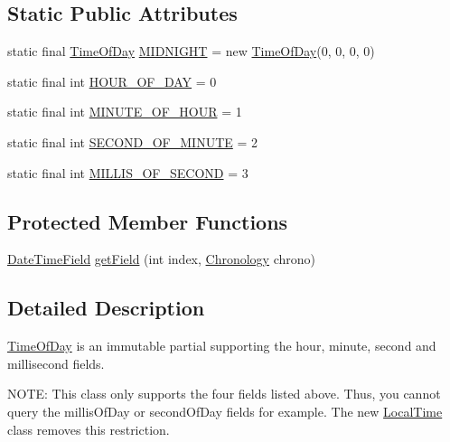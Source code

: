 \subsection*{Static Public Attributes}
\begin{DoxyCompactItemize}
\item 
static final \hyperlink{classorg_1_1joda_1_1time_1_1_time_of_day}{Time\-Of\-Day} \hyperlink{classorg_1_1joda_1_1time_1_1_time_of_day_afe663b1a8c33a8a853c7e8272ead9c70}{M\-I\-D\-N\-I\-G\-H\-T} = new \hyperlink{classorg_1_1joda_1_1time_1_1_time_of_day}{Time\-Of\-Day}(0, 0, 0, 0)
\item 
static final int \hyperlink{classorg_1_1joda_1_1time_1_1_time_of_day_a15d43f40b7279e700452c0a8ebf4f4c4}{H\-O\-U\-R\-\_\-\-O\-F\-\_\-\-D\-A\-Y} = 0
\item 
static final int \hyperlink{classorg_1_1joda_1_1time_1_1_time_of_day_a677626f485fafd75086254786d3b1397}{M\-I\-N\-U\-T\-E\-\_\-\-O\-F\-\_\-\-H\-O\-U\-R} = 1
\item 
static final int \hyperlink{classorg_1_1joda_1_1time_1_1_time_of_day_ab1cc4115688246202564f8ff3297a670}{S\-E\-C\-O\-N\-D\-\_\-\-O\-F\-\_\-\-M\-I\-N\-U\-T\-E} = 2
\item 
static final int \hyperlink{classorg_1_1joda_1_1time_1_1_time_of_day_a99d2c895d9d7082d0328fc7adc9c5568}{M\-I\-L\-L\-I\-S\-\_\-\-O\-F\-\_\-\-S\-E\-C\-O\-N\-D} = 3
\end{DoxyCompactItemize}
\subsection*{Protected Member Functions}
\begin{DoxyCompactItemize}
\item 
\hyperlink{classorg_1_1joda_1_1time_1_1_date_time_field}{Date\-Time\-Field} \hyperlink{classorg_1_1joda_1_1time_1_1_time_of_day_a788f18fe03bf2dafda479548c4e430e2}{get\-Field} (int index, \hyperlink{classorg_1_1joda_1_1time_1_1_chronology}{Chronology} chrono)
\end{DoxyCompactItemize}


\subsection{Detailed Description}
\hyperlink{classorg_1_1joda_1_1time_1_1_time_of_day}{Time\-Of\-Day} is an immutable partial supporting the hour, minute, second and millisecond fields. 

N\-O\-T\-E\-: This class only supports the four fields listed above. Thus, you cannot query the millis\-Of\-Day or second\-Of\-Day fields for example. The new {\ttfamily \hyperlink{classorg_1_1joda_1_1time_1_1_local_time}{Local\-Time}} class removes this restriction. 

